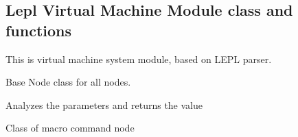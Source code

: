 \documentclass[letterpaper,10pt,english]{sphinxmanual}
\begin{document}
\subsection{Lepl Virtual Machine Module class and functions}
\label{sysmod:lepl-virtual-machine-module-class-and-functions}\label{sysmod:module-pyfrid.modules.system.vm.leplvm}

\begin{fulllineitems}
\label{sysmod:pyfrid.modules.system.vm.leplvm.BaseLeplVMModule}
This is virtual machine system module, based on LEPL parser.

\end{fulllineitems}


\begin{fulllineitems}
\label{sysmod:pyfrid.modules.system.vm.leplvm.BaseNode}
Base Node class for all nodes.

\begin{fulllineitems}
\label{sysmod:pyfrid.modules.system.vm.leplvm.BaseNode.process}
Analyzes the parameters and returns the value

\end{fulllineitems}


\end{fulllineitems}


\begin{fulllineitems}
\label{sysmod:pyfrid.modules.system.vm.leplvm.CmdStmtNode}
Class of macro command node

\end{fulllineitems}

\end{document}
